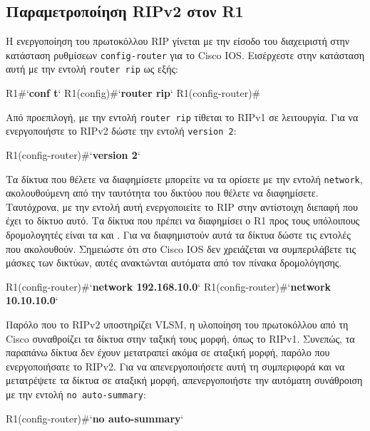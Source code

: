 \documentclass{EdipyLabs} %
\begin{document}
\subsection{Παραμετροποίηση RIPv2 στον R1}
H ενεργοποίηση του πρωτοκόλλου RIP γίνεται με την είσοδο του διαχειριστή στην κατάσταση ρυθμίσεων \texttt{config-router} για το Cisco IOS. Εισέρχεστε στην κατάσταση αυτή με την εντολή \texttt{router rip} ως εξής:

\begin{CommandBox}
R1#`\textbf{conf t}`
R1(config)#`\textbf{router rip}`
R1(config-router)#
\end{CommandBox}

Από προεπιλογή, με την εντολή \texttt{router rip} τίθεται το RIPv1 σε λειτουργία. Για να ενεργοποιήστε το RIPv2 δώστε την εντολή \texttt{version~2}:

\begin{CommandBox}
R1(config-router)#`\textbf{version 2}`
\end{CommandBox}

Τα δίκτυα που θέλετε να διαφημίσετε μπορείτε να τα ορίσετε με την εντολή \texttt{network}, ακολουθούμενη από την ταυτότητα του δικτύου που θέλετε να διαφημίσετε. Ταυτόχρονα, με την εντολή αυτή ενεργοποιείτε το RIP στην αντίστοιχη διεπαφή που έχει το δίκτυο αυτό. Τα δίκτυα που πρέπει να διαφημίσει ο R1 προς τους υπόλοιπους δρομολογητές είναι τα  και . Για να διαφημιστούν αυτά τα δίκτυα δώστε τις εντολές που ακολουθούν. Σημειώστε ότι στο Cisco IOS δεν χρειάζεται να συμπεριλάβετε τις μάσκες των δικτύων, αυτές ανακτώνται αυτόματα από τον πίνακα δρομολόγησης.

\begin{CommandBox}
R1(config-router)#`\textbf{network 192.168.10.0}`
R1(config-router)#`\textbf{network 10.10.10.0}`
\end{CommandBox}

Παρόλο που το RIPv2 υποστηρίζει VLSM, η υλοποίηση του πρωτοκόλλου από τη Cisco συναθροίζει τα δίκτυα στην ταξική τους μορφή, όπως το RIPv1. Συνεπώς, τα παραπάνω δίκτυα δεν έχουν μετατραπεί ακόμα σε αταξική μορφή, παρόλο που ενεργοποιήσατε το RIPv2. Για να απενεργοποιήσετε αυτή τη συμπεριφορά και να μετατρέψετε τα δίκτυα σε αταξική μορφή, απενεργοποιήστε την αυτόματη συνάθροιση με την εντολή \texttt{no auto-summary}:

\begin{CommandBox}
R1(config-router)#`\textbf{no auto-summary}`
\end{CommandBox}
\end{document}
